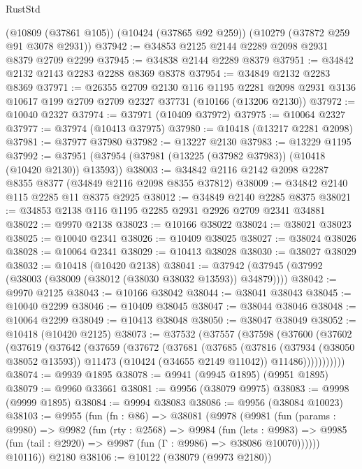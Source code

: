 \begin{lexlean}{RustStd}
\begin{coremodule}
    (@10809 (@37861 @105))
    (@10424 (@37865 @92 @259))
    (@10279 (@37872 @259 @91 @3078 @2931))
@37942 := @34853 @2125 @2144 @2289 @2098 @2931 @8379 @2709 @2299
@37945 := @34838 @2144 @2289 @8379
@37951 := @34842 @2132 @2143 @2283 @2288 @8369 @8378
@37954 := @34849 @2132 @2283 @8369
@37971 := @26355
    @2709
    @2130
    @116
    @1195
    @2281
    @2098
    @2931
    @3136
    @10617
    @199
    @2709
    @2709
    @2327
    @37731
    (@10166 (@13206 @2130))
@37972 := @10040 @2327
@37974 := @37971 (@10409 @37972)
@37975 := @10064 @2327
@37977 := @37974 (@10413 @37975)
@37980 := @10418 (@13217 @2281 @2098)
@37981 := @37977 @37980
@37982 := @13227 @2130
@37983 := @13229 @1195
@37992 := @37951 (@37954 (@37981 (@13225 (@37982 @37983)) (@10418 (@10420 @2130)) @13593))
@38003 := @34842 @2116 @2142 @2098 @2287 @8355 @8377 (@34849 @2116 @2098 @8355 @37812)
@38009 := @34842 @2140 @115 @2285 @11 @8375 @2925
@38012 := @34849 @2140 @2285 @8375
@38021 := @34853 @2138 @116 @1195 @2285 @2931 @2926 @2709 @2341 @34881
@38022 := @9970 @2138
@38023 := @10166 @38022
@38024 := @38021 @38023
@38025 := @10040 @2341
@38026 := @10409 @38025
@38027 := @38024 @38026
@38028 := @10064 @2341
@38029 := @10413 @38028
@38030 := @38027 @38029
@38032 := @10418 (@10420 @2138)
@38041 := @37942 (@37945 (@37992 (@38003 (@38009 (@38012 (@38030 @38032 @13593)) @34879))))
@38042 := @9970 @2125
@38043 := @10166 @38042
@38044 := @38041 @38043
@38045 := @10040 @2299
@38046 := @10409 @38045
@38047 := @38044 @38046
@38048 := @10064 @2299
@38049 := @10413 @38048
@38050 := @38047 @38049
@38052 := @10418 (@10420 @2125)
@38073 := @37532
    (@37557
      (@37598
        (@37600
          (@37602
            (@37619
              (@37642
                (@37659
                  (@37672
                    (@37681
                      (@37685
                        (@37816
                          (@37934 (@38050 @38052 @13593))
                          @11473
                          (@10424 (@34655 @2149 @11042))
                          @11486)))))))))))
@38074 := @9939 @1895
@38078 := @9941 (@9945 @1895) (@9951 @1895)
@38079 := @9960 @33661
@38081 := @9956 (@38079 @9975)
@38083 := @9998 (@9999 @1895)
@38084 := @9994 @38083
@38086 := @9956 (@38084 @10023)
@38103 := @9955
    (fun (fn : @86) =>
    @38081
      (@9978
        (@9981
          (fun (params : @9980) =>
          @9982
            (fun (rty : @2568) =>
            @9984
              (fun (lets : @9983) =>
              @9985 (fun (tail : @2920) => @9987 (fun (Γ : @9986) => @38086 @10070))))))
        @10116))
    @2180
@38106 := @10122 (@38079 (@9973 @2180))

\end{coremodule}
\end{lexlean}
